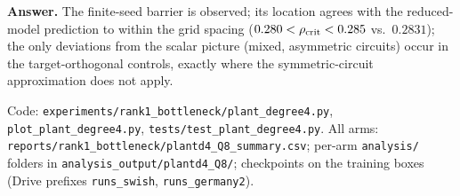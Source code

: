 \documentclass[10pt]{article}
\begin{document}
\textbf{Answer.} The finite-seed barrier is observed; its location agrees with the reduced-model prediction
to within the grid spacing ($0.280<\rho_{\rm crit}<0.285$ vs.\ $0.2831$); the only deviations from the
scalar picture (mixed, asymmetric circuits) occur in the target-orthogonal controls, exactly where the
symmetric-circuit approximation does not apply.

\vspace{2pt}\footnotesize\sloppy
Code: \texttt{experiments/rank1\_bottleneck/plant\_degree4.py}, \texttt{plot\_plant\_degree4.py}, \texttt{tests/test\_plant\_degree4.py}. All arms: \texttt{reports/rank1\_bottleneck/plantd4\_Q8\_summary.csv}; per-arm \texttt{analysis/} folders in \texttt{analysis\_output/plantd4\_Q8/}; checkpoints on the training boxes (Drive prefixes \texttt{runs\_swish}, \texttt{runs\_germany2}).
\end{document}
